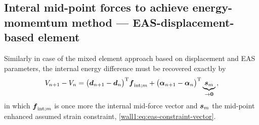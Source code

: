 \subsection{Interal mid-point forces to achieve
energy-momemtum method --- EAS-displacement-based element}
Similarly in case of the mixed element approach based on displacement and EAS
parameters, the internal energy difference must be recovered exactly by
\begin{equation}
   V_{n+1} - V_n
   = \big( \boldsymbol{d}_{n+1} - \boldsymbol{d}_n \big)^{\mathrm{T}} \boldsymbol{f}_{\text{int};m}
   + \big( \boldsymbol{\alpha}_{n+1} - \boldsymbol{\alpha}_n \big)^{\mathrm{T}}
   \underbrace{\boldsymbol{s}_m}_{\to \boldsymbol{0}}
   \text{,}
\end{equation}
in which $\boldsymbol{f}_{\text{int};m}$ is once more the internal mid-force vector and
$\boldsymbol{s}_m$ the mid-point enhanced assumed strain constraint, \cf{}
\eqref{wall1:eq:eas-constraint-vector}. 

